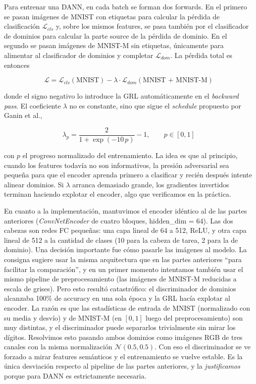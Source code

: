 \documentclass[12pt]{article}
\begin{document}
Para entrenar una DANN, en cada batch se forman dos forwards. En el primero se pasan imágenes de MNIST con etiquetas para calcular la pérdida de clasificación $\mathcal{L}_{cls}$ y, sobre los mismos features, se pasa también por el clasificador de dominios para calcular la parte source de la pérdida de dominio. En el segundo se pasan imágenes de MNIST-M sin etiquetas, únicamente para alimentar al clasificador de dominios y completar $\mathcal{L}_{dom}$. La pérdida total es entonces

\begin{equation}
    \mathcal{L} = \mathcal{L}_{cls}(\text{MNIST}) - \lambda \cdot \mathcal{L}_{dom}(\text{MNIST + MNIST-M})
\end{equation}

donde el signo negativo lo introduce la GRL automáticamente en el \textit{backward pass}. El coeficiente $\lambda$ no es constante, sino que sigue el \textit{schedule} propuesto por Ganin et al.,

\begin{equation}
    \lambda_p = \frac{2}{1 + \exp(-10\,p)} - 1, \qquad p \in [0, 1]
\end{equation}

con $p$ el progreso normalizado del entrenamiento. La idea es que al principio, cuando los features todavía no son informativos, la presión adversarial sea pequeña para que el encoder aprenda primero a clasificar y recién después intente alinear dominios. Si $\lambda$ arranca demasiado grande, los gradientes invertidos terminan haciendo explotar el encoder, algo que verificamos en la práctica.

En cuanto a la implementación, mantuvimos el encoder idéntico al de las partes anteriores (\textit{ConvNetEncoder} de cuatro bloques, hidden\_dim = 64). Las dos cabezas son redes FC pequeñas: una capa lineal de 64 a 512, ReLU, y otra capa lineal de 512 a la cantidad de clases (10 para la cabeza de tarea, 2 para la de dominio). Una decisión importante fue cómo pasarle las imágenes al modelo. La consigna sugiere usar la misma arquitectura que en las partes anteriores ``para facilitar la comparación'', y en un primer momento intentamos también usar el mismo pipeline de preprocesamiento (las imágenes de MNIST-M reducidas a escala de grises). Pero esto resultó catastrófico: el discriminador de dominios alcanzaba 100\% de accuracy en una sola época y la GRL hacía explotar al encoder. La razón es que las estadísticas de entrada de MNIST (normalizado con su media y desvío) y de MNIST-M (en $[0,1]$ luego del preprocesamiento) son muy distintas, y el discriminador puede separarlos trivialmente sin mirar los dígitos. Resolvimos esto pasando ambos dominios como imágenes RGB de tres canales con la misma normalización $\mathcal{N}(0.5, 0.5)$. Con eso el discriminador se ve forzado a mirar features semánticos y el entrenamiento se vuelve estable. Es la única desviación respecto al pipeline de las partes anteriores, y la \textit{justificamos} porque para DANN es estrictamente necesaria.
\end{document}
